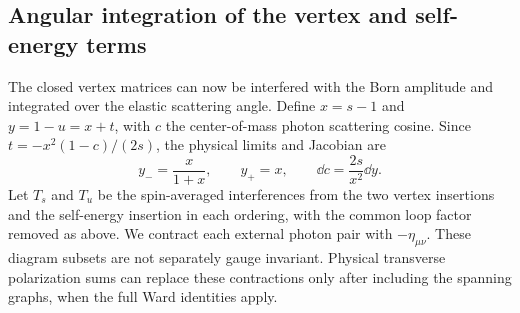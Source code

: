 \subsection{Angular integration of the vertex and self-energy terms}
\label{sec:comp-supp-vertex-angle}
The closed vertex matrices can now be interfered with the Born
amplitude and integrated over the elastic scattering angle.
Define $x=s-1$ and $y=1-u=x+t$, with $c$ the center-of-mass
photon scattering cosine. Since $t=-x^2(1-c)/(2s)$, the physical
limits and Jacobian are
\begin{equation}
 y_- =\frac{x}{1+x},\qquad y_+=x,\qquad
 \dd c=\frac{2s}{x^2}\dd y.
\end{equation}
Let $T_s$ and $T_u$ be the spin-averaged interferences from the two
vertex insertions and the self-energy insertion in each ordering,
with the common loop factor removed as above. We contract each
external photon pair with $-\eta_{\mu\nu}$. These diagram subsets
are not separately gauge invariant. Physical transverse polarization
sums can replace these contractions only after including the
spanning graphs, when the full Ward identities apply.

